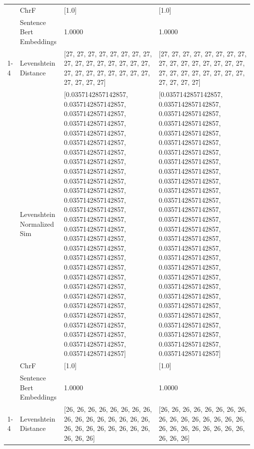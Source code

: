 \begin{tabular}{llll}
 & ChrF & [1.0] & [1.0] \\
 & Sentence Bert Embeddings & 1.0000 & 1.0000 \\
\cline{1-4}
\multirow[t]{4}{*}{Ekeoke nigo gekogendereria.} & Levenshtein Distance & [27, 27, 27, 27, 27, 27, 27, 27, 27, 27, 27, 27, 27, 27, 27, 27, 27, 27, 27, 27, 27, 27, 27, 27, 27, 27, 27, 27] & [27, 27, 27, 27, 27, 27, 27, 27, 27, 27, 27, 27, 27, 27, 27, 27, 27, 27, 27, 27, 27, 27, 27, 27, 27, 27, 27, 27] \\
 & Levenshtein Normalized Sim & [0.0357142857142857, 0.0357142857142857, 0.0357142857142857, 0.0357142857142857, 0.0357142857142857, 0.0357142857142857, 0.0357142857142857, 0.0357142857142857, 0.0357142857142857, 0.0357142857142857, 0.0357142857142857, 0.0357142857142857, 0.0357142857142857, 0.0357142857142857, 0.0357142857142857, 0.0357142857142857, 0.0357142857142857, 0.0357142857142857, 0.0357142857142857, 0.0357142857142857, 0.0357142857142857, 0.0357142857142857, 0.0357142857142857, 0.0357142857142857, 0.0357142857142857, 0.0357142857142857, 0.0357142857142857, 0.0357142857142857] & [0.0357142857142857, 0.0357142857142857, 0.0357142857142857, 0.0357142857142857, 0.0357142857142857, 0.0357142857142857, 0.0357142857142857, 0.0357142857142857, 0.0357142857142857, 0.0357142857142857, 0.0357142857142857, 0.0357142857142857, 0.0357142857142857, 0.0357142857142857, 0.0357142857142857, 0.0357142857142857, 0.0357142857142857, 0.0357142857142857, 0.0357142857142857, 0.0357142857142857, 0.0357142857142857, 0.0357142857142857, 0.0357142857142857, 0.0357142857142857, 0.0357142857142857, 0.0357142857142857, 0.0357142857142857, 0.0357142857142857] \\
 & ChrF & [1.0] & [1.0] \\
 & Sentence Bert Embeddings & 1.0000 & 1.0000 \\
\cline{1-4}
\multirow[t]{4}{*}{Amanyira omoke tigocha ogosara.} & Levenshtein Distance & [26, 26, 26, 26, 26, 26, 26, 26, 26, 26, 26, 26, 26, 26, 26, 26, 26, 26, 26, 26, 26, 26, 26, 26, 26, 26, 26] & [26, 26, 26, 26, 26, 26, 26, 26, 26, 26, 26, 26, 26, 26, 26, 26, 26, 26, 26, 26, 26, 26, 26, 26, 26, 26, 26] \\

\end{tabular}
